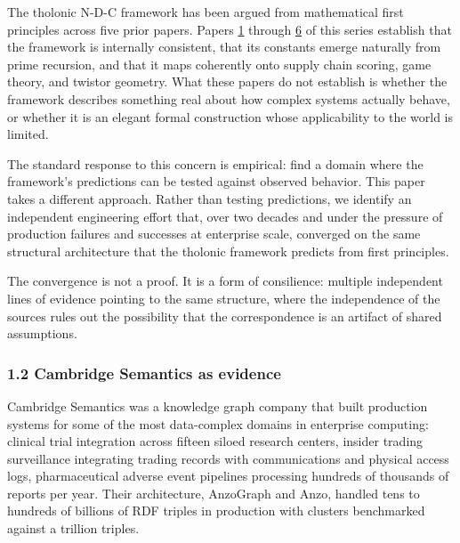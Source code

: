 \documentclass[
  11pt,
  letterpaper,
]{article}
\begin{document}
The tholonic N-D-C framework has been argued from mathematical first
principles across five prior papers. Papers
\href{https://github.com/baardev/truevalue/blob/main/docnav/Research/papers/1_recursive-tholonic-five-constants/1_recursive-tholonic-five-constants.pdf}{1}
through
\href{https://github.com/baardev/truevalue/blob/main/docnav/Research/papers/6_qualitative-nature-integers-triadic-roles/6_qualitative-nature-integers-triadic-roles.pdf}{6}
of this series establish that the framework is internally consistent,
that its constants emerge naturally from prime recursion, and that it
maps coherently onto supply chain scoring, game theory, and twistor
geometry. What these papers do not establish is whether the framework
describes something real about how complex systems actually behave, or
whether it is an elegant formal construction whose applicability to the
world is limited.

The standard response to this concern is empirical: find a domain where
the framework's predictions can be tested against observed behavior.
This paper takes a different approach. Rather than testing predictions,
we identify an independent engineering effort that, over two decades and
under the pressure of production failures and successes at enterprise
scale, converged on the same structural architecture that the tholonic
framework predicts from first principles.

The convergence is not a proof. It is a form of consilience: multiple
independent lines of evidence pointing to the same structure, where the
independence of the sources rules out the possibility that the
correspondence is an artifact of shared assumptions.

\subsubsection{1.2 Cambridge Semantics as
evidence}\label{cambridge-semantics-as-evidence}

Cambridge Semantics was a knowledge graph company that built production
systems for some of the most data-complex domains in enterprise
computing: clinical trial integration across fifteen siloed research
centers, insider trading surveillance integrating trading records with
communications and physical access logs, pharmaceutical adverse event
pipelines processing hundreds of thousands of reports per year. Their
architecture, AnzoGraph and Anzo, handled tens to hundreds of billions
of RDF triples in production with clusters benchmarked against a
trillion triples.
\end{document}
